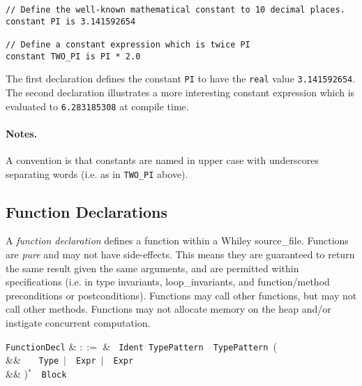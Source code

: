 \begin{lstlisting}
// Define the well-known mathematical constant to 10 decimal places.
constant PI is 3.141592654

// Define a constant expression which is twice PI
constant TWO_PI is PI * 2.0
\end{lstlisting}

The first declaration defines the constant \lstinline{PI} to have the
\lstinline{real} value \lstinline{3.141592654}.  The second
declaration illustrates a more interesting constant expression which
is evaluated to \lstinline{6.283185308} at compile time.

\paragraph{Notes.}  A convention is that constants are named in upper
case with underscores separating words (i.e. as in \lstinline{TWO_PI}
above).


\subsection{Function Declarations}
\label{c_source_files_function_decl}

A {\em function declaration} defines a function within a Whiley \gls{source_file}.  Functions are {\em pure} and may not have side-effects.  This means they are guaranteed to return the same result given the same arguments, and are permitted within specifications (i.e. in type invariants, \gls{loop_invariant}s, and function/method \gls{precondition}s or \gls{postcondition}s).  Functions may call other functions, but may not call other methods.  Functions may not allocate memory on the heap and/or instigate concurrent computation.

\begin{syntax}
  \verb+FunctionDecl+ & $::=$ & \ \verb+Ident+\
  \verb+TypePattern+\ \token{=>}\ \verb+TypePattern+\ \big(\\
  && \ \ \ \verb+Type+\ $|$\ \
  \verb+Expr+\ $|$\ \ \verb+Expr+\\
  && \big)$^*$\ \token{:}\ \verb+Block+\\
\end{syntax}

